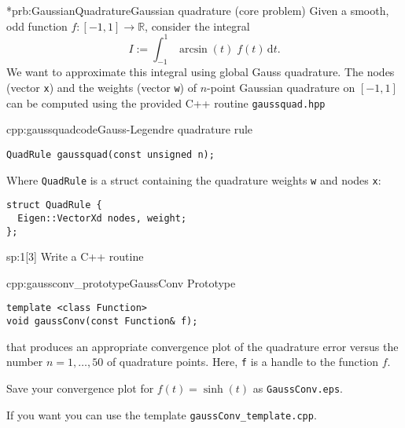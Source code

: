 
\begin{samproblem}*{prb:GaussianQuadrature}{Gaussian quadrature (core problem)}{
  Given a smooth, odd function $f:[-1,1]\rightarrow \mathbb{R}$, consider the integral
  \begin{equation}
  \label{eq:GaussianQuadrature_IntArcsin}
    I := \int_{-1}^{1} \arcsin(t) \; f(t) \,\mathrm{d}t.
  \end{equation}
  We want to approximate this integral using global Gauss quadrature.
  The nodes (vector \texttt{x}) and the weights (vector \texttt{w}) of $n$-point Gaussian quadrature on $[-1,1]$ 
  can be computed using the provided C++ routine \texttt{gaussquad.hpp}
}

\begin{samcode}[C++-code]{cpp:gaussquadcode}{Gauss-Legendre quadrature rule}
  \begin{lstlisting}[style=cpp]
QuadRule gaussquad(const unsigned n);
  \end{lstlisting}
  Where \texttt{QuadRule} is a struct containing the quadrature weights \texttt{w} and nodes \texttt{x}:
  \begin{lstlisting}[style=cpp]
struct QuadRule {
  Eigen::VectorXd nodes, weight;
};
  \end{lstlisting}
\end{samcode}


\begin{subproblem}{sp:1}[3]
  Write a C++ routine
  \begin{samcode}[C++-code]{cpp:gaussconv_prototype}{GaussConv Prototype}
    \begin{lstlisting}[style=cpp]
template <class Function>
void gaussConv(const Function& f);
    \end{lstlisting}
  \end{samcode}
  that produces an appropriate convergence plot of the quadrature error versus the
  number $n=1,\ldots,50$ of quadrature points. Here, \texttt{f} is a handle to the function $f$.

  Save your convergence plot for $f(t)=\sinh(t)$ as \texttt{GaussConv.eps}.
  
  \begin{samhint}
    If you want you can use the template \texttt{gaussConv\_template.cpp}. 
  \end{samhint}


\end{subproblem}
\end{samproblem}
